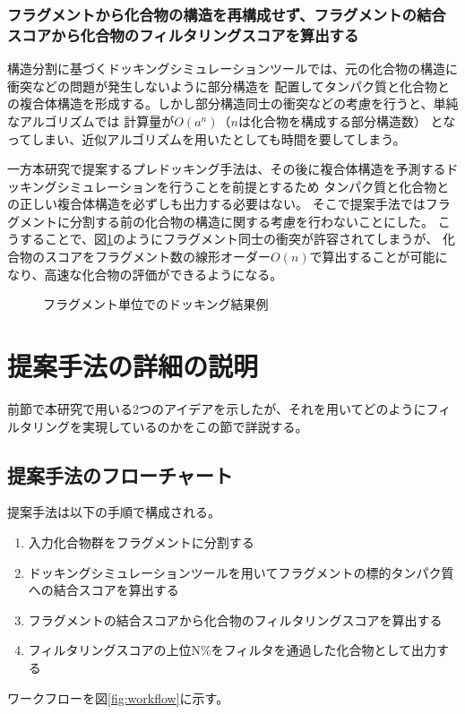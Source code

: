 \subsubsection{フラグメントから化合物の構造を再構成せず、フラグメントの結合スコアから化合物のフィルタリングスコアを算出する}
構造分割に基づくドッキングシミュレーションツールでは、元の化合物の構造に衝突などの問題が発生しないように部分構造を
配置してタンパク質と化合物との複合体構造を形成する。しかし部分構造同士の衝突などの考慮を行うと、単純なアルゴリズムでは
計算量が$O(a^n) （nは化合物を構成する部分構造数）$ となってしまい、近似アルゴリズムを用いたとしても時間を要してしまう。

一方本研究で提案するプレドッキング手法は、その後に複合体構造を予測するドッキングシミュレーションを行うことを前提とするため
タンパク質と化合物との正しい複合体構造を必ずしも出力する必要はない。
そこで提案手法ではフラグメントに分割する前の化合物の構造に関する考慮を行わないことにした。
こうすることで、図\ref{fig:divided_fragment}のようにフラグメント同士の衝突が許容されてしまうが、
化合物のスコアをフラグメント数の線形オーダー$O(n)$で算出することが可能になり、高速な化合物の評価ができるようになる。

\begin{figure}[t]
 \begin{center}
  \caption{フラグメント単位でのドッキング結果例}
  \label{fig:divided_fragment}
 \end{center}
\end{figure}



\section{提案手法の詳細の説明}
前節で本研究で用いる2つのアイデアを示したが、それを用いてどのようにフィルタリングを実現しているのかをこの節で詳説する。

\subsection{提案手法のフローチャート}\label{subsec:flowchart}
提案手法は以下の手順で構成される。
\begin{enumerate}
\item 入力化合物群をフラグメントに分割する
\item ドッキングシミュレーションツールを用いてフラグメントの標的タンパク質への結合スコアを算出する
\item フラグメントの結合スコアから化合物のフィルタリングスコアを算出する
\item フィルタリングスコアの上位N\%をフィルタを通過した化合物として出力する
\end{enumerate}
ワークフローを図\ref{fig:workflow}に示す。

